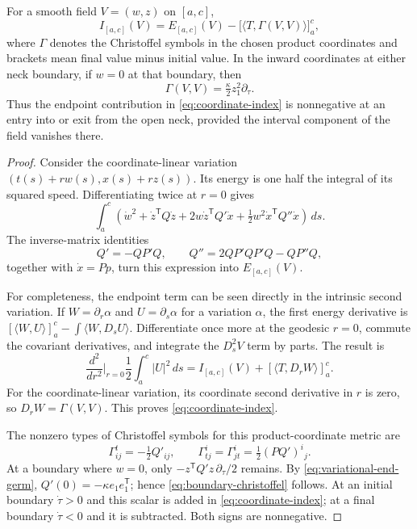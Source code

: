 \begin{lemma}\label{lem:coordinate-index}
For a smooth field $V=(w,z)$ on $[a,c]$,
\begin{equation}\label{eq:coordinate-index}
 I_{[a,c]}(V)=E_{[a,c]}(V)
       -\bigl[\langle T,\Gamma(V,V)\rangle\bigr]_a^c,
\end{equation}
where $\Gamma$ denotes the Christoffel symbols in the chosen product
coordinates and brackets mean final value minus initial value.
In the inward coordinates at either neck boundary, if $w=0$ at that
boundary, then
\begin{equation}\label{eq:boundary-christoffel}
 \Gamma(V,V)=\tfrac\kappa2 z_1^2\partial_\tau.
\end{equation}
Thus the endpoint contribution in \eqref{eq:coordinate-index} is
nonnegative at an entry into or exit from the open neck, provided the
interval component of the field vanishes there.
\end{lemma}

\begin{proof}
Consider the coordinate-linear variation
$(t(s)+r w(s),x(s)+r z(s))$.  Its energy is one half the integral of its
squared speed.  Differentiating twice at $r=0$ gives
\[
 \int_a^c\left(\dot w^2+\dot z^{\mathsf T}Q\dot z
   +2w\dot z^{\mathsf T}Q'\dot x
   +\tfrac12w^2\dot x^{\mathsf T}Q''\dot x\right)\,ds.
\]
The inverse-matrix identities
\[
 Q'=-QP'Q,\qquad
 Q''=2QP'QP'Q-QP''Q,
\]
together with $\dot x=Pp$, turn this expression into
$E_{[a,c]}(V)$.

For completeness, the endpoint term can be seen directly in the
intrinsic second variation.  If $W=\partial_r\alpha$ and
$U=\partial_s\alpha$ for a variation $\alpha$, the first energy derivative
is $[\langle W,U\rangle]_a^c-\int\langle W,D_sU\rangle$.
Differentiate once more at the geodesic $r=0$, commute the covariant
derivatives, and integrate the $D_s^2V$ term by parts.  The result is
\[
 \frac{d^2}{dr^2}\bigg|_{r=0}\frac12\int_a^c|U|^2\,ds
 =I_{[a,c]}(V)+[\langle T,D_rW\rangle]_a^c.
\]
For the coordinate-linear variation, its coordinate second derivative in
$r$ is zero, so $D_rW=\Gamma(V,V)$.  This proves
\eqref{eq:coordinate-index}.

The nonzero types of Christoffel symbols for this product-coordinate
metric are
\[
 \Gamma^t_{ij}=-\tfrac12Q'_{ij},\qquad
 \Gamma^i_{tj}=\Gamma^i_{jt}=\tfrac12(PQ')^i{}_j.
\]
At a boundary where $w=0$, only
$-z^{\mathsf T}Q'z\,\partial_\tau/2$ remains.  By
\eqref{eq:variational-end-germ}, $Q'(0)=-\kappa e_1e_1^{\mathsf T}$;
hence \eqref{eq:boundary-christoffel} follows.  At an initial boundary
$\dot\tau>0$ and this scalar is added in
\eqref{eq:coordinate-index}; at a final boundary $\dot\tau<0$ and it is
subtracted.  Both signs are nonnegative.
\end{proof}

